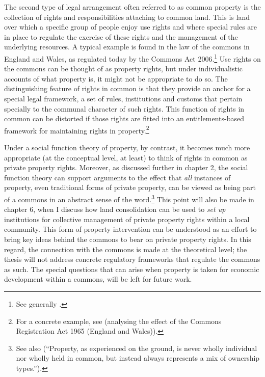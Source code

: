 The second type of legal arrangement often referred to as common property is the collection of rights and responsibilities attaching to common land. This is land over which a specific group of people enjoy use rights and where special rules are in place to regulate the exercise of these rights and the management of the underlying resources. A typical example is found in the law of the commons in England and Wales, as regulated today by the Commons Act 2006.\footnote{See generally \cite{rodgers10}.} Use rights on the commons can be thought of as property rights, but under individualistic accounts of what property is, it might not be appropriate to do so. The distinguishing feature of rights in common is that they provide an anchor for a special legal framework, a set of rules, institutions and customs that pertain specially to the communal character of such rights. This function of rights in common can be distorted if those rights are fitted into an entitlements-based framework for maintaining rights in property.\footnote{For a concrete example, see \cite[469--471]{rodgers10} (analysing the effect of the Commons Registration Act 1965 (England and Wales)).}

Under a social function theory of property, by contrast, it becomes much more appropriate (at the conceptual level, at least) to think of rights in common as private property rights. Moreover, as discussed further in chapter 2, the social function theory can support arguments to the effect that {\it all} instances of property, even traditional forms of private property, can be viewed as being part of a commons in an abstract sense of the word.\footnote{See also \cite[16-18]{fennel11} (``Property, as experienced on the ground, is never wholly individual nor wholly 
held in common, but instead always represents a mix of ownership types.'').} This point will also be made in chapter 6, when I discuss how land consolidation can be used to {\it set up} institutions for collective management of private property rights within a local community. This form of property intervention can be understood as an effort to bring key ideas behind the commons to bear on private property rights. In this regard, the connection with the commons is made at the theoretical level; the thesis will not address concrete regulatory frameworks that regulate the commons as such. The special questions that can arise when property is taken for economic development within a commons, will be left for future work.

